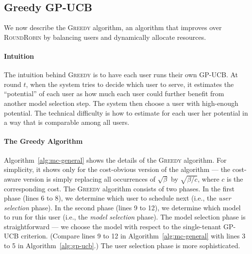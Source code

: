\documentclass[letterpaper]{vldb}
\newcommand{\rr}{\textsc{RoundRobin}\xspace}
\newcommand{\greedy}{\textsc{Greedy}\xspace}
\begin{document}
\subsection{Greedy GP-UCB}

We now describe the \greedy algorithm, an 
algorithm that improves over \rr by balancing
users and dynamically allocate resources. 

\vspace{-0.5em}
\paragraph*{Intuition}
The intuition behind \greedy is to have
each user runs their own GP-UCB. At round
$t$, when the system tries to decide which
user to serve, it estimates the
``potential'' of each user as how much each
user could further benefit from another
model selection step. The system then
choose a user with high-enough potential.
The technical difficulty is how to
estimate for each user her potential
in a way that is comparable among all users.

\vspace{-0.5em}
\paragraph*{The Greedy Algorithm}

Algorithm~\ref{alg:mc-general} shows the details 
of the \greedy algorithm. For simplicity,
it shows only for the cost-obvious version of the algorithm --- the cost-aware version is simply replacing all occurrences of $\sqrt{\beta}$ by $\sqrt{\beta/c}$, where $c$ is the corresponding cost.
The \greedy algorithm consists of two phases.
In the first phase (lines 6 to 8), we determine which user to schedule next (i.e., the \emph{user selection} phase).
In the second phase (lines 9 to 12), we determine which model to run for this user (i.e., the \emph{model selection} phase).
The model selection phase is straightforward --- we choose the model with respect to the single-tenant GP-UCB criterion. (Compare lines 9 to 12 in Algorithm~\ref{alg:mc-general} with lines 3 to 5 in Algorithm~\ref{alg:gp-ucb}.)
The user selection phase is more sophisticated.
\end{document}
